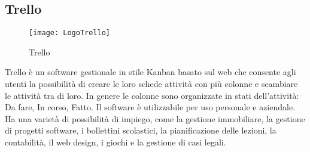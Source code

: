 \subsection{Trello}
\begin{figure}[htpb!]
\center
  \texttt{[image: LogoTrello]}
  \caption{Trello}
\end{figure}
Trello\cite{tr} è un software gestionale in stile Kanban basato sul web che consente agli utenti la possibilità di creare le loro schede attività con più colonne e scambiare le attività tra di loro. In genere le colonne sono organizzate in stati dell'attività: Da fare, In corso, Fatto. Il software è utilizzabile per uso personale e aziendale. Ha una varietà di possibilità di impiego, come la gestione immobiliare, la gestione di progetti software, i bollettini scolastici, la pianificazione delle lezioni, la contabilità, il web design, i giochi e la gestione di casi legali.

\newpage
